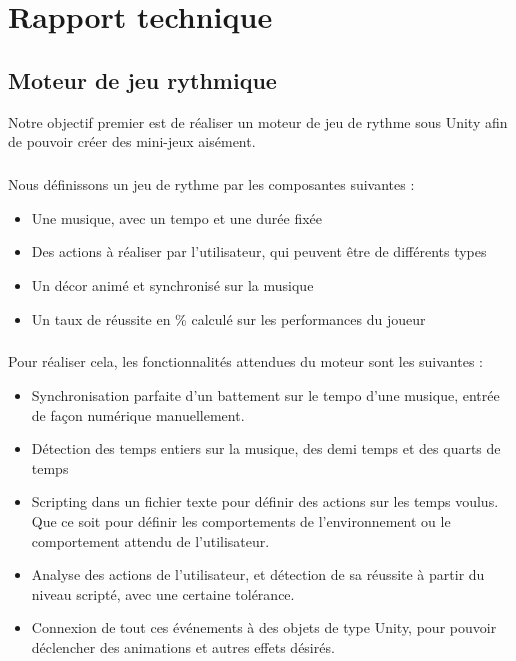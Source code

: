 \chapter{Rapport technique}


\section{Moteur de jeu rythmique}

Notre objectif premier est de réaliser un moteur de jeu de rythme sous Unity afin de pouvoir créer des mini-jeux aisément.

\paragraph{}

Nous définissons un jeu de rythme par les composantes suivantes :
\begin{itemize}
\item Une musique, avec un tempo et une durée fixée
\item Des actions à réaliser par l'utilisateur, qui peuvent être de différents types
\item Un décor animé et synchronisé sur la musique
\item Un taux de réussite en \% calculé sur les performances du joueur
\end{itemize}

\paragraph{}

Pour réaliser cela, les fonctionnalités attendues du moteur sont les suivantes :
\begin{itemize}
\item Synchronisation parfaite d'un battement sur le tempo d'une musique, entrée de façon numérique manuellement.
\item Détection des temps entiers sur la musique, des demi temps et des quarts de temps
\item Scripting dans un fichier texte pour définir des actions sur les temps voulus. Que ce soit pour définir les comportements de l'environnement ou le comportement attendu de l'utilisateur.
\item Analyse des actions de l'utilisateur, et détection de sa réussite à partir du niveau scripté, avec une certaine tolérance.
\item Connexion de tout ces événements à des objets de type Unity, pour pouvoir déclencher des animations et autres effets désirés.
\end{itemize}


